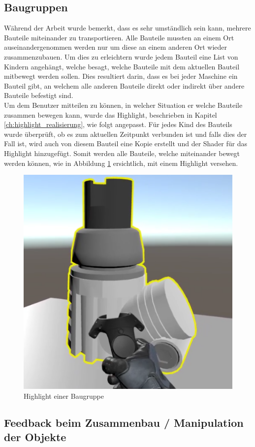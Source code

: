 \subsection{Baugruppen}
\label{ch:baugruppen}
Während der Arbeit wurde bemerkt, dass es sehr umständlich sein kann, mehrere Bauteile miteinander zu transportieren. Alle Bauteile mussten an einem Ort auseinandergenommen werden nur um diese an einem anderen Ort wieder zusammenzubauen. Um dies zu erleichtern wurde jedem Bauteil eine List von Kindern angehängt, welche besagt, welche Bauteile mit dem aktuellen Bauteil mitbewegt werden sollen. Dies resultiert darin, dass es bei jeder Maschine ein Bauteil gibt, an welchem alle anderen Bauteile direkt oder indirekt über andere Bauteile befestigt sind. \\

\noindent Um dem Benutzer mitteilen zu können, in welcher Situation er welche Bauteile zusammen bewegen kann, wurde das Highlight, beschrieben in Kapitel \ref{ch:highlight_realisierung}, wie folgt angepasst. Für jedes Kind des Bauteils wurde überprüft, ob es zum aktuellen Zeitpunkt verbunden ist und falls dies der Fall ist, wird auch von diesem Bauteil eine Kopie erstellt und der Shader für das Highlight hinzugefügt. Somit werden alle Bauteile, welche miteinander bewegt werden können, wie in Abbildung \ref{fig:highlight_baugruppe} ersichtlich, mit einem Highlight versehen.

\begin{figure}[h!]
	\centering
	\includegraphics[keepaspectratio,width=0.37\linewidth]{img/Baugruppe_Highlight.PNG}
	\caption{Highlight einer Baugruppe}
	\label{fig:highlight_baugruppe}
\end{figure}

\subsection{Feedback beim Zusammenbau / Manipulation der Objekte}
\label{ch:feedback_zusammenbau_manipulation}


